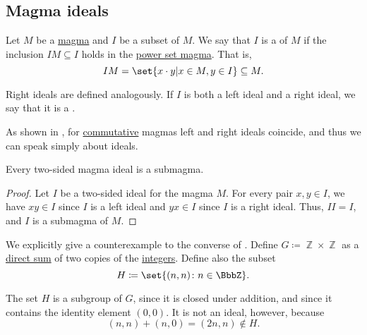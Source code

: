 \subsection{Magma ideals}\label{sec:magma_ideals}

\begin{definition}\label{def:magma_ideal}\mimprovised
  Let \( M \) be a \hyperref[def:magma]{magma} and \( I \) be a subset of \( M \). We say that \( I \) is a  of \( M \) if the inclusion \( IM \subseteq I \) holds in the \hyperref[def:magma/power_set]{power set magma}. That is,
  \begin{equation*}
    I M = \set{ x \cdot y | x \in M, y \in I } \subseteq M.
  \end{equation*}

  Right ideals are defined analogously. If \( I \) is both a left ideal and a right ideal, we say that it is a .

  As shown in , for \hyperref[def:magma/commutative]{commutative} magmas left and right ideals coincide, and thus we can speak simply about ideals.
\end{definition}

\begin{proposition}\label{thm:magma_ideal_is_submagma}
  Every two-sided magma ideal is a submagma.
\end{proposition}
\begin{proof}
  Let \( I \) be a two-sided ideal for the magma \( M \). For every pair \( x, y \in I \), we have \( xy \in I \) since \( I \) is a left ideal and \( yx \in I \) since \( I \) is a right ideal. Thus, \( II = I \), and \( I \) is a submagma of \( M \).
\end{proof}

\begin{example}\label{ex:subgroup_is_not_ideal}
  We explicitly give a counterexample to the converse of . Define \( G \coloneqq \BbbZ \times \BbbZ \) as a \hyperref[def:group_direct_sum]{direct sum} of two copies of the \hyperref[def:set_of_integers]{integers}. Define also the subset
  \begin{equation*}
    H \coloneqq \set{ (n, n) \colon n \in \BbbZ }.
  \end{equation*}

  The set \( H \) is a subgroup of \( G \), since it is closed under addition, and since it contains the identity element \( (0, 0) \). It is not an ideal, however, because
  \begin{equation*}
    (n, n) + (n, 0) = (2n, n) \not\in H.
  \end{equation*}
\end{example}

